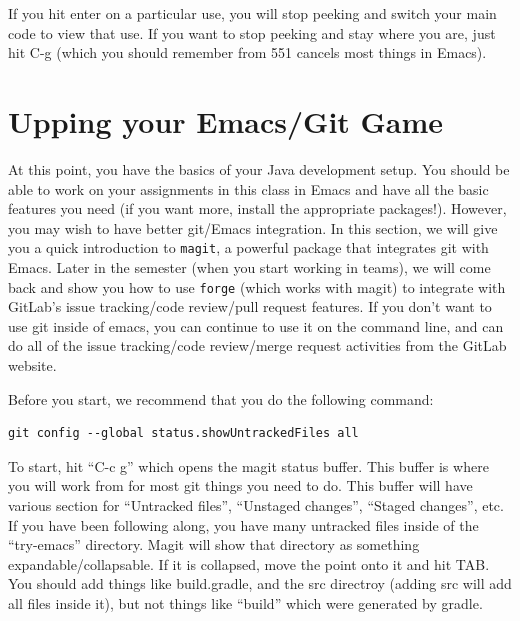 \documentclass[12pt]{article}
\begin{document}

If you hit enter on a particular use, you will stop peeking and
switch your main code to view that use.  If you want to stop peeking
and stay where you are, just hit C-g (which you should remember
from 551 cancels most things in Emacs).

\section{Upping your Emacs/Git Game}
At this point, you have the basics of your Java development setup.
You should be able to work on your assignments in this class in Emacs
and have all the basic features you need (if you want more, install
the appropriate packages!).  However, you may wish to have better
git/Emacs integration.  In this section, we will give you a quick
introduction to \verb+magit+, a powerful package that integrates git
with Emacs.  Later in the semester (when you start working in teams),
we will come back and show you how to use \verb+forge+ (which works
with magit) to integrate with GitLab's issue tracking/code review/pull
request features.  If you don't want to use git inside of emacs, you
can continue to use it on the command line, and can do all of the
issue tracking/code review/merge request activities from the GitLab
website.

Before you start, we recommend that you do the following command:
\begin{verbatim}
git config --global status.showUntrackedFiles all
\end{verbatim}


To start, hit ``C-c g'' which opens the magit status buffer.  This
buffer is where you will work from for most git things you need to do.
This buffer will have various section for ``Untracked files'',
``Unstaged changes'', ``Staged changes'', etc.  If you have
been following along, you have many untracked files inside of
the ``try-emacs'' directory.   Magit will show that directory
as something expandable/collapsable.  If it is collapsed,
move the point onto it and hit TAB. You should add things like
build.gradle, and the src directroy (adding src will add all files
inside it), but not things like ``build'' which were generated by gradle.
\end{document}
